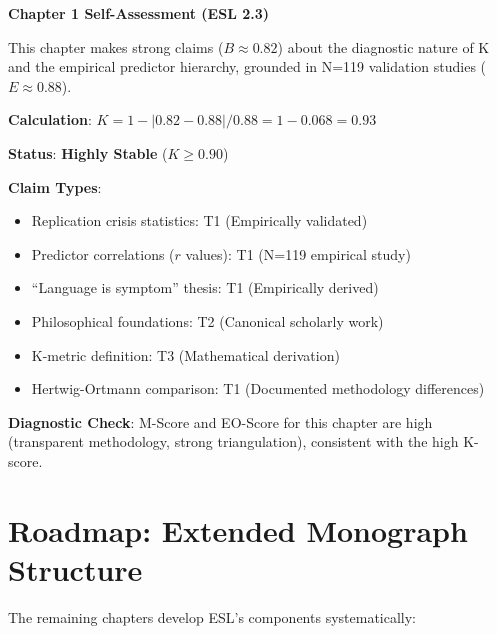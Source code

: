 \documentclass[11pt,a4paper]{article}
\begin{document}
\begin{eslbox}
\textbf{Chapter 1 Self-Assessment (ESL 2.3)}

This chapter makes strong claims ($B \approx 0.82$) about the diagnostic nature of K and the empirical predictor hierarchy, grounded in N=119 validation studies ($E \approx 0.88$).

\textbf{Calculation}: $K = 1 - |0.82 - 0.88| / 0.88 = 1 - 0.068 = 0.93$

\textbf{Status}: \textcolor{eslgreen}{\textbf{Highly Stable}} ($K \geq 0.90$)

\textbf{Claim Types}:
\begin{itemize}
    \item Replication crisis statistics: T1 (Empirically validated)
    \item Predictor correlations ($r$ values): T1 (N=119 empirical study)
    \item ``Language is symptom'' thesis: T1 (Empirically derived)
    \item Philosophical foundations: T2 (Canonical scholarly work)
    \item K-metric definition: T3 (Mathematical derivation)
    \item Hertwig-Ortmann comparison: T1 (Documented methodology differences)
\end{itemize}

\textbf{Diagnostic Check}: M-Score and EO-Score for this chapter are high (transparent methodology, strong triangulation), consistent with the high K-score.
\end{eslbox}


\section{Roadmap: Extended Monograph Structure}
\label{sec:roadmap}

The remaining chapters develop ESL's components systematically:
\end{document}
